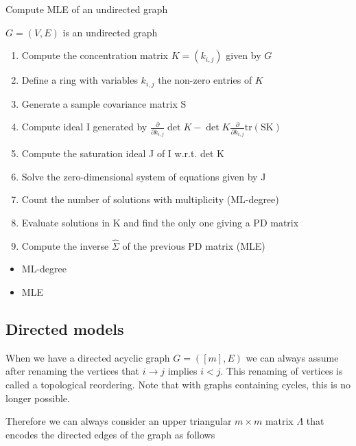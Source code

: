 \documentclass[10pt,a4paper]{article}
\begin{document}
\begin{algorithm}[H]
\caption[Aun]{Compute MLE of an undirected graph}
\label{Aun}
\begin{algorithmic}
\REQUIRE $G=(V,E)$ is an undirected graph
\begin{enumerate}
\item Compute the concentration matrix $K=(k_{i,j})$ given by $G$
\item Define a ring with variables $k_{i,j}$ the non-zero entries of $K$ 
\item Generate a sample covariance matrix S
\item Compute ideal I generated by $\frac{\partial}{\partial k_{i,j}} \det K-\det K\frac{\partial }{\partial k_{i,j}}\operatorname{tr(S K)}$
\item Compute the saturation ideal J of I w.r.t. det K
\item Solve the zero-dimensional system of equations given by J
\item Count the number of solutions with multiplicity (ML-degree)
\item Evaluate solutions in K and find the only one giving a PD matrix
\item Compute the inverse $\hat{\Sigma}$ of the previous PD matrix (MLE)
\end{enumerate}

\RETURN
\begin{itemize}
\item ML-degree 
\item MLE 
\end{itemize}


\end{algorithmic}
\end{algorithm}


\subsection{Directed models}

When we have a directed acyclic graph $G=([m],E)$ we can always assume after renaming the vertices that $ i \rightarrow j$ implies $i < j$. This renaming of vertices is called a topological reordering. Note that with graphs containing cycles, this is no longer possible. 

Therefore we can always consider an upper triangular $m\times m$ matrix $\Lambda$ that encodes the directed edges of the graph as follows
\end{document}
